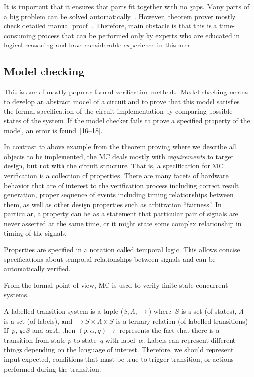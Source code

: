 \begin{multicols}{2}
   It is important that it ensures that parts fit together with no gaps. Many parts of a big problem can be solved
automatically~\cite{9bar}. However, theorem prover mostly check detailed manual proof~\cite{4bar}.
Therefore, main obstacle is that this is a time-consuming process that can be performed only by experts who are
educated in logical reasoning and have considerable experience in this area.
{%

}


\subsection{Model checking} %

   \noindent
This is one of mostly popular formal verification methods. Model checking means to develop an
abstract model of a circuit and to prove that this model satisfies the formal specification of the circuit
implementation by comparing possible states of the system. If the model checker fails to prove a specified
property of the model, an error is found~[16--18].

   In contrast to above example from the theorem proving where we describe all objects to be implemented,
the MC deals mostly with \textit{requirements} to target design, but not with the circuit structure. That is, a
specification for MC verification is a collection of properties. There are many facets of hardware behavior that
are of interest to the verification process including correct result generation, proper sequence of events including
timing relationships between them, as well as other design properties such as arbitration
``fairness.'' In particular, a property can be as a statement that particular pair of signals are never
asserted at the same time, or it might state some complex relationship in timing of the signals.
{

}

   Properties are specified in a notation called temporal logic. This allows concise specifications about
temporal relationships between signals and can be automatically verified.

   From the formal point of view, MC is used to verify finite state concurrent systems.

    A labelled transition system is a tuple ($S, \Lambda , \rightarrow$)
where~$S$ is a set (of states),
$\Lambda$ is a set (of labels), and  $\rightarrow  S \times \Lambda \times S$ is a  ternary relation (of labelled
transitions) If\ $p$, $q \varepsilon S$ and $\alpha \varepsilon \Lambda$, then $(p,\alpha ,q)  \rightarrow$
represents the fact that there is a transition from state $p$ to state~$q$ with label~$\alpha$. Labels can represent
different things depending on the language of interest. Therefore, we should represent input expected, conditions
that must be true to trigger  transition, or actions performed during the transition.


\end{multicols}
